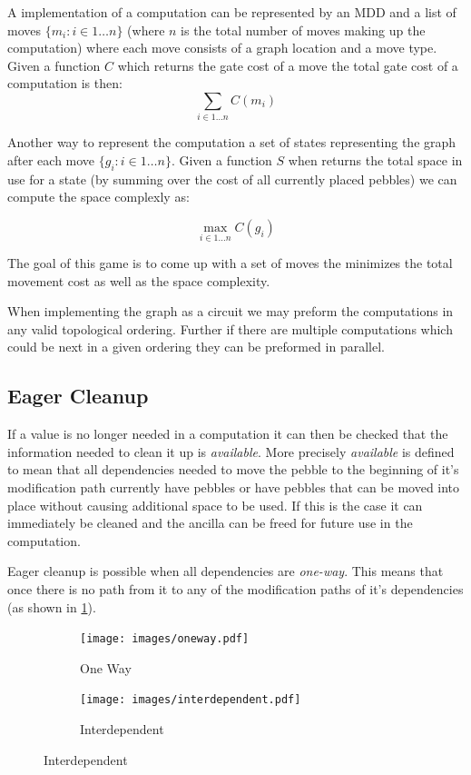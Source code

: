 A implementation of a computation can be represented by an MDD and a list of
moves $\{m_i:i \in 1 \dotsc n\}$ (where $n$ is the total number of moves making up the
computation) where each move consists of a graph location and a move type. Given
a function $C$ which returns the gate cost of a move the total gate cost of a
computation is then:
\[ \sum_{i\in 1 \dotsc n} C(m_i) \]

Another way to represent the computation a set of states representing the graph
after each move $\{g_i:i \in 1 \dotsc n\}$. Given a function $S$ when returns
the total space in use for a state (by summing over the cost of all currently
placed pebbles) we can compute the space complexly as:

\[ \max_{i\in 1 \dotsc n} C(g_i) \]

The goal of this game is to come up with a set of moves the minimizes the total
movement cost as well as the space complexity.

When implementing the graph as a circuit we may preform the computations in any
valid topological ordering. Further if there are multiple computations which
could be next in a given ordering they can be preformed in parallel.

\subsection{Eager Cleanup}

If a value is no longer needed in a computation it can then be checked that the
information needed to clean it up is \emph{available}.  More precisely
\emph{available} is defined to mean that all dependencies needed to move the
pebble to the beginning of it's modification path currently have pebbles or have
pebbles that can be moved into place without causing additional space to be
used. If this is the case it can immediately be cleaned and the ancilla can be freed for
future use in the computation.

Eager cleanup is possible when all dependencies are \emph{one-way}.
This means that once there is no path from it to any of the modification paths
of it's dependencies (as shown in \cref{fig:one-way}).

\begin{figure}
  \centering
  \begin{subfigure}[b]{0.3\textwidth}
    \texttt{[image: images/oneway.pdf]}
    \caption{One Way}
    \label{fig:one-way}
  \end{subfigure}
  \qquad
  \begin{subfigure}[b]{0.3\textwidth}
    \texttt{[image: images/interdependent.pdf]}
    \caption{Interdependent}
    \label{fig:interdep}
  \end{subfigure}
\end{figure}

